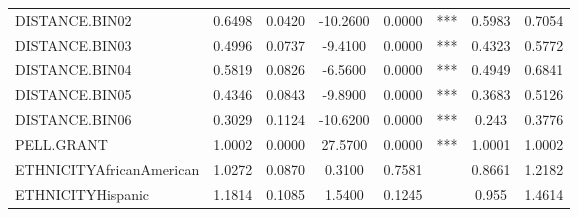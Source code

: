 \documentclass[12pt,english]{report}
\begin{document}
\begin{table}[h]
\begin{adjustbox}{width=0.95\textwidth}
\begin{tabular}{|lccclccc|}
DISTANCE.BIN02                  & 0.6498   & 0.0420     & -10.2600 & 0.0000    & ***         & 0.5983 & 0.7054  \\
DISTANCE.BIN03                  & 0.4996   & 0.0737     & -9.4100  & 0.0000    & ***         & 0.4323 & 0.5772  \\
DISTANCE.BIN04                  & 0.5819   & 0.0826     & -6.5600  & 0.0000    & ***         & 0.4949 & 0.6841  \\
DISTANCE.BIN05                  & 0.4346   & 0.0843     & -9.8900  & 0.0000    & ***         & 0.3683 & 0.5126  \\
DISTANCE.BIN06                  & 0.3029   & 0.1124     & -10.6200 & 0.0000    & ***         & 0.243  & 0.3776  \\
PELL.GRANT                      & 1.0002   & 0.0000     & 27.5700  & 0.0000    & ***         & 1.0001 & 1.0002  \\
ETHNICITYAfricanAmerican & 1.0272   & 0.0870     & 0.3100   & 0.7581    &             & 0.8661 & 1.2182  \\
ETHNICITYHispanic               & 1.1814   & 0.1085     & 1.5400   & 0.1245    &             & 0.955  & 1.4614  \\

\end{tabular}
\end{adjustbox}
\end{table}
\end{document}
